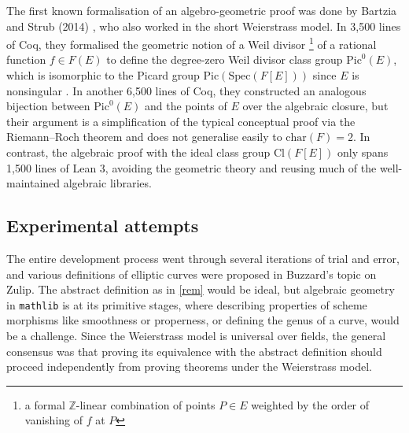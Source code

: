 \documentclass[a4paper,UKenglish,cleveref,autoref,thm-restate]{lipics-v2021}
\begin{document}
The first known formalisation of an algebro-geometric proof was done by Bartzia and Strub (2014) \cite{bartzia}, who also worked in the short Weierstrass model. In 3,500 lines of Coq, they formalised the geometric notion of a Weil divisor \footnote{a formal $ \mathbb{Z} $-linear combination of points $ P \in E $ weighted by the order of vanishing of $ f $ at $ P $} of a rational function $ f \in F(E) $ to define the degree-zero Weil divisor class group $ \mathrm{Pic}^0(E) $, which is isomorphic to the Picard group $ \mathrm{Pic}(\mathrm{Spec}(F[E])) $ since $ E $ is nonsingular \cite[Corollary II.6.16]{hartshorne}. In another 6,500 lines of Coq, they constructed an analogous bijection between $ \mathrm{Pic}^0(E) $ and the points of $ E $ over the algebraic closure, but their argument is a simplification of the typical conceptual proof via the Riemann--Roch theorem and does not generalise easily to $ \mathrm{char}(F) = 2 $. In contrast, the algebraic proof with the ideal class group $ \mathrm{Cl}(F[E]) $ only spans 1,500 lines of Lean 3, avoiding the geometric theory and reusing much of the well-maintained algebraic libraries.

\subsection{Experimental attempts}
\label{sec:experiment}

The entire development process went through several iterations of trial and error, and various definitions of elliptic curves were proposed in Buzzard's topic on Zulip. The abstract definition as in \cref{rem} would be ideal, but algebraic geometry in \texttt{mathlib} is at its primitive stages, where describing properties of scheme morphisms like smoothness or properness, or defining the genus of a curve, would be a challenge. Since the Weierstrass model is universal over fields, the general consensus was that proving its equivalence with the abstract definition should proceed independently from proving theorems under the Weierstrass model.
\end{document}

